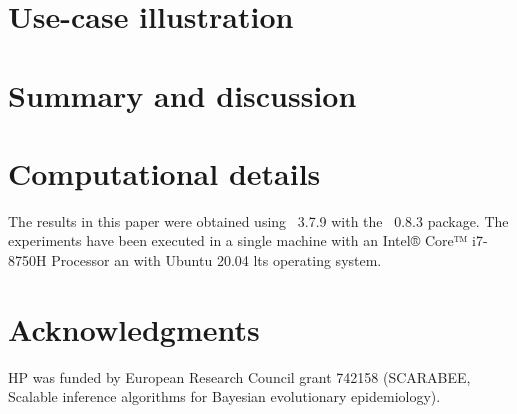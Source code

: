 \documentclass[article]{jss}
\begin{document}
\section{Use-case illustration}


\section{Summary and discussion} \label{sec:summary}



\section*{Computational details}

The results in this paper were obtained using ~3.7.9
with the ~0.8.3 package. The experiments have been executed
in a single machine with an Intel® Core™ i7-8750H Processor an with
Ubuntu 20.04 lts operating system.

\section*{Acknowledgments}

HP was funded by European Research Council grant 742158 (SCARABEE,
Scalable inference algorithms for Bayesian evolutionary epidemiology).

\clearpage


\end{document}
